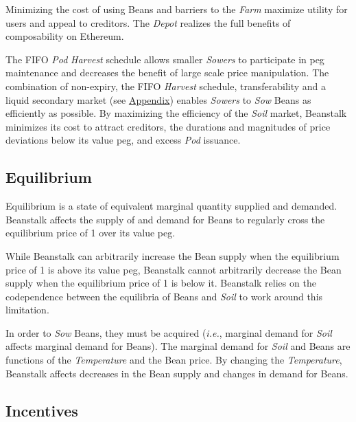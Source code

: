\documentclass[tikz]{article}
\newcommand{\term}[1]{\textsl{#1}}
\newcommand{\Bean}{} %
\begin{document}
Minimizing the cost of using Beans and barriers to the \term{Farm} maximize utility for users and appeal to creditors. The \term{Depot} realizes the full benefits of composability on Ethereum.

\newpage

The FIFO \term{Pod} \term{Harvest} schedule allows smaller \term{Sowers} to participate in peg maintenance and decreases the benefit of large scale price manipulation. The combination of non-expiry, the FIFO \term{Harvest} schedule, transferability and a liquid secondary market (see \hyperlink{subsection.14.5}{Appendix}) enables \term{Sowers} to \term{Sow} Beans as efficiently as possible. By maximizing the efficiency of the \term{Soil} market, Beanstalk minimizes its cost to attract creditors, the durations and magnitudes of price deviations below its value peg, and excess \term{Pod} issuance.


\subsection{Equilibrium}

Equilibrium is a state of equivalent marginal quantity supplied and demanded. Beanstalk affects the supply of and demand for Beans to regularly cross the equilibrium price of \Bean1 over its value peg. 

While Beanstalk can arbitrarily increase the Bean supply when the equilibrium price of \Bean1 is above its value peg, Beanstalk cannot arbitrarily decrease the Bean supply when the equilibrium price of \Bean1 is below it. Beanstalk relies on the codependence between the equilibria of Beans and \term{Soil} to work around this limitation. 

In order to \term{Sow} Beans, they must be acquired (\term{i.e.}, marginal demand for \term{Soil} affects marginal demand for Beans). The marginal demand for \term{Soil} and Beans are functions of the \term{Temperature} and the Bean price. By changing the \term{Temperature}, Beanstalk affects decreases in the Bean supply and changes in demand for Beans. 


\subsection{Incentives}
\end{document}
